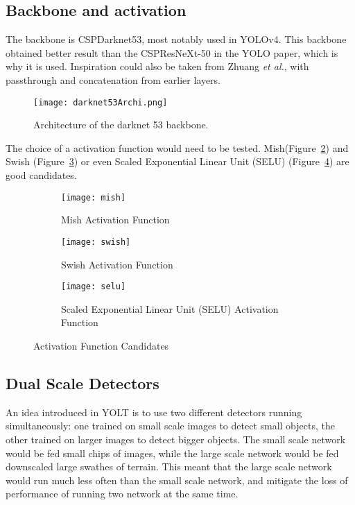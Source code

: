 \subsection{Backbone and activation}
The backbone is CSPDarknet53\cite{CSPDarknet53}, most notably used in YOLOv4\cite{yolov4}. This backbone obtained better result than the CSPResNeXt-50\cite{resNeXt} in the YOLO paper, which is why it is used. Inspiration could also be taken from Zhuang \textit{et al.}\cite{zhuang2019}, with passthrough and concatenation from earlier layers.

\begin{figure}[H]
  \centering
  \texttt{[image: darknet53Archi.png]}
	\caption[]{Architecture of the darknet 53 backbone.}
  \label{}
\end{figure}

The choice of a activation function would need to be tested. Mish\cite{mish}(Figure~\ref{fig:mish}) and Swish (Figure~\ref{fig:swish}) or even Scaled Exponential Linear Unit (SELU) (Figure~\ref{fig:selu}) are good candidates. 

\begin{figure}[H]
	\begin{subfigure}[t]{.3\textwidth}
		  \centering
		  \texttt{[image: mish]}  
		  \caption{Mish Activation Function}
		  \label{fig:mish}
	\end{subfigure}
	\begin{subfigure}[t]{.3\textwidth}
		  \centering
		      \texttt{[image: swish]}  
		        \caption{Swish Activation Function}
			  \label{fig:swish}
	\end{subfigure}
	\begin{subfigure}[t]{.3\textwidth}
		\centering
		\texttt{[image: selu]}  
		\caption{Scaled Exponential Linear Unit (SELU) Activation Function}
		\label{fig:selu}
	\end{subfigure}
	\caption{Activation Function Candidates}
	\label{fig:activations}
\end{figure}


\subsection{Dual Scale Detectors}
An idea introduced in YOLT\cite{yolt} is to use two different detectors running simultaneously: one trained on small scale images to detect small objects, the other trained on larger images to detect bigger objects. The small scale network would be fed small chips of images, while the large scale network would be fed downscaled large swathes of terrain. This meant that the large scale network would run much less often than the small scale network, and mitigate the loss of performance of running two network at the same time.

